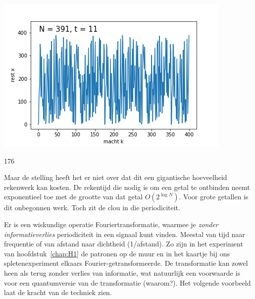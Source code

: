 \documentclass[../../main.tex]{subfiles}
\begin{document}
\begin{flushleft}
\begin{minipage}{.55\textwidth}
\includegraphics[width=\textwidth]{./img/shor_N=391_t=11.png}
\end{minipage}%
\hfill
\begin{minipage}{.4\textwidth}
\end{minipage}%
\end{flushleft}
\begin{antwoord}[-4cm]
176
\end{antwoord}
Maar de stelling heeft het er niet over dat dit een gigantische hoeveelheid rekenwerk kan kosten. De rekentijd die nodig is om een getal te ontbinden neemt exponentieel toe met de grootte van dat getal $O(2^{\log N})$. Voor grote getallen is dit onbegonnen werk. Toch zit de clou in die periodiciteit. 

Er is een wiskundige operatie Fouriertransformatie, waarmee je \textit{zonder informatieverlies} periodiciteit in een signaal kunt vinden. Meestal van tijd naar frequentie of van afstand naar dichtheid (1/afstand). Zo zijn in het experiment van hoofdstuk~\ref{chap:H1} de patronen op de muur en in het kaartje bij ons spletenexperiment elkaars Fourier-getransformeerde. De transformatie kan zowel heen als terug zonder verlies van informatie, wat natuurlijk een voorwaarde is voor een quantumversie van de transformatie (waarom?). Het volgende voorbeeld laat de kracht van de techniek zien. 
\end{document}
